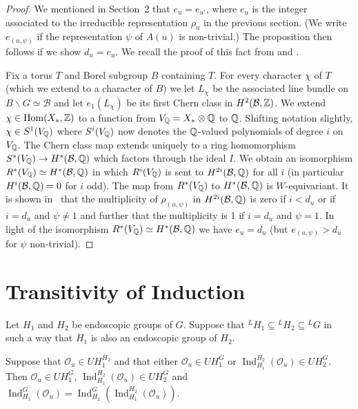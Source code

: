 \documentclass{amsart}
\newenvironment{cthm}[1]
  {\renewcommand\thethm{\sc #1}\thm}
  {\endthm}
\newcommand\bB{{\mathcal B}}
\newcommand\Hom	{\operatorname{Hom}}
\newcommand\Ind	{\operatorname{Ind}}
\newcommand\IndHH	{\Ind_{H_1}^{H_2}(\cO_u)}
\newcommand\cO		{{\mathcal O}}
\newcommand\Q		{{\Bbb Q}}
\newcommand\rhou	{\rho_u}
\newcommand\Z		{{\Bbb Z}}
\begin{document}
\begin{proof} We mentioned in Section~2 that $e_u = e_{u'}$, where
$e_u$ is 
the integer
associated to the irreducible representation $\rhou$ in the
previous section.
(We write $e_{(u,\psi)}$ if the representation $\psi$ of $A(u)$
is non-trivial.)
The proposition then follows if we show $d_u = e_u$.  We recall
the proof
of this fact from \cite{LS} and \cite{BM1}.

Fix a torus $T$ and Borel subgroup $B$ containing $T$.  For every
character
$\chi$ of $T$ (which we extend to a character of $B$) we let
$L_\chi$ be the 
associated line bundle on $B \backslash G \simeq \bB$ and let
$e_1(L_\chi)$ be 
its first Chern class in $H^2(\bB,\Z)$.  We extend $\chi \in
\Hom(X_*,\Z)$ to a 
function from $V_\Q = X_* \otimes \Q$ to $\Q$. Shifting notation
slightly,
$\chi \in S^1(V_\Q)$ where $S^i(V_\Q)$ now denotes the
$\Q$-valued
polynomials of degree $i$ on $V_\Q$.
The Chern class map extends uniquely to a ring homomorphism
$S^*(V_\Q) \to H^*(\bB,\Q)$ which factors through the ideal $I$. 
We obtain an
isomorphism $R^*(V_\Q) \simeq H^*(\bB,\Q)$ in which $R^i(V_\Q)$ 
is sent to
$H^{2i}(\bB,\Q)$ for all $i$ (in particular $H^i(\bB,\Q) = 0$ for
$i$ odd).  
The map from $R^*(V_\Q)$ to $H^*(\bB,\Q)$ is $W$-equivariant.  It
is shown 
in~\cite{BM} that the multiplicity of $\rho_{(u,\psi)}$ in
$H^{2i}(\bB,\Q)$ is zero if $i<d_u$ or if $i=d_u$ and $\psi \ne 1$
and further
that
the multiplicity is 1 if $i=d_u$ and $\psi = 1$.  In light of the
isomorphism
$R^*(V_\Q) \simeq H^*(\bB,\Q)$ we have $e_u = d_u$ (but
$e_{(u,\psi)} > d_u$ for
$\psi$ non-trivial).
\end{proof}


\section{Transitivity of Induction} %

\bigskip

Let $H_1$ and $H_2$ be endoscopic groups of $G$.  Suppose that 
${}^LH_1 \subseteq {}^LH_2 \subseteq {}^LG$ in such a way that
$H_1$ is also
an endoscopic group of $H_2$.  

\begin{cthm}{Proposition} Suppose that $\cO_u \in UH_1^{H_2}$ and
that either
     $\cO_u \in UH_1^G$ or $\IndHH \in UH_2^G$.  Then $\cO_u \in
UH_1^G$, 
     $\IndHH \in UH_2^G$ and $\Ind_{H_1}^G(\cO_u) =
\Ind_{H_2}^G(\IndHH)$.
     \end{cthm}
\end{document}
